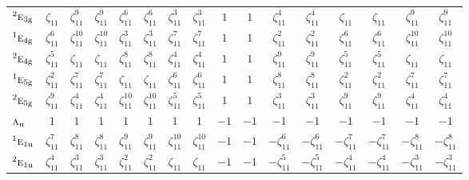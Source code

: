 \documentclass[10pt,a4paper]{article}
\numberwithin{equation}{section}
\newcommand{\irr}[1]{\text{\normalfont\scshape #1}}
\newcommand{\conjpair}[1]{{}^{#1}}
\newcommand{\ptag}[1]{\mathrm{#1}}
\newcommand{\rootunity}[1]{\zeta_{#1}}
\begin{document}
{\begin{longtable}{@{}lccccccccccccccc@{}}
$\conjpair{2}\irr{e}_{3\ptag{g}}$ & $\rootunity{11}$ & $\rootunity{11}^{9}$ & $\rootunity{11}^{9}$ & $\rootunity{11}^{6}$ & $\rootunity{11}^{6}$ & $\rootunity{11}^{3}$ & $\rootunity{11}^{3}$ & $1$ & $1$ & $\rootunity{11}^{4}$ & $\rootunity{11}^{4}$ & $\rootunity{11}$ & $\rootunity{11}$ & $\rootunity{11}^{9}$ & $\rootunity{11}^{9}$\\
$\conjpair{1}\irr{e}_{4\ptag{g}}$ & $\rootunity{11}^{6}$ & $\rootunity{11}^{10}$ & $\rootunity{11}^{10}$ & $\rootunity{11}^{3}$ & $\rootunity{11}^{3}$ & $\rootunity{11}^{7}$ & $\rootunity{11}^{7}$ & $1$ & $1$ & $\rootunity{11}^{2}$ & $\rootunity{11}^{2}$ & $\rootunity{11}^{6}$ & $\rootunity{11}^{6}$ & $\rootunity{11}^{10}$ & $\rootunity{11}^{10}$\\
$\conjpair{2}\irr{e}_{4\ptag{g}}$ & $\rootunity{11}^{5}$ & $\rootunity{11}$ & $\rootunity{11}$ & $\rootunity{11}^{8}$ & $\rootunity{11}^{8}$ & $\rootunity{11}^{4}$ & $\rootunity{11}^{4}$ & $1$ & $1$ & $\rootunity{11}^{9}$ & $\rootunity{11}^{9}$ & $\rootunity{11}^{5}$ & $\rootunity{11}^{5}$ & $\rootunity{11}$ & $\rootunity{11}$\\
$\conjpair{1}\irr{e}_{5\ptag{g}}$ & $\rootunity{11}^{2}$ & $\rootunity{11}^{7}$ & $\rootunity{11}^{7}$ & $\rootunity{11}$ & $\rootunity{11}$ & $\rootunity{11}^{6}$ & $\rootunity{11}^{6}$ & $1$ & $1$ & $\rootunity{11}^{8}$ & $\rootunity{11}^{8}$ & $\rootunity{11}^{2}$ & $\rootunity{11}^{2}$ & $\rootunity{11}^{7}$ & $\rootunity{11}^{7}$\\
$\conjpair{2}\irr{e}_{5\ptag{g}}$ & $\rootunity{11}^{9}$ & $\rootunity{11}^{4}$ & $\rootunity{11}^{4}$ & $\rootunity{11}^{10}$ & $\rootunity{11}^{10}$ & $\rootunity{11}^{5}$ & $\rootunity{11}^{5}$ & $1$ & $1$ & $\rootunity{11}^{3}$ & $\rootunity{11}^{3}$ & $\rootunity{11}^{9}$ & $\rootunity{11}^{9}$ & $\rootunity{11}^{4}$ & $\rootunity{11}^{4}$\\
$\irr{a}_{\ptag{u}}$ & $1$ & $1$ & $1$ & $1$ & $1$ & $1$ & $1$ & $-1$ & $-1$ & $-1$ & $-1$ & $-1$ & $-1$ & $-1$ & $-1$\\
$\conjpair{1}\irr{e}_{1\ptag{u}}$ & $\rootunity{11}^{7}$ & $\rootunity{11}^{8}$ & $\rootunity{11}^{8}$ & $\rootunity{11}^{9}$ & $\rootunity{11}^{9}$ & $\rootunity{11}^{10}$ & $\rootunity{11}^{10}$ & $-1$ & $-1$ & $-\rootunity{11}^{6}$ & $-\rootunity{11}^{6}$ & $-\rootunity{11}^{7}$ & $-\rootunity{11}^{7}$ & $-\rootunity{11}^{8}$ & $-\rootunity{11}^{8}$\\
$\conjpair{2}\irr{e}_{1\ptag{u}}$ & $\rootunity{11}^{4}$ & $\rootunity{11}^{3}$ & $\rootunity{11}^{3}$ & $\rootunity{11}^{2}$ & $\rootunity{11}^{2}$ & $\rootunity{11}$ & $\rootunity{11}$ & $-1$ & $-1$ & $-\rootunity{11}^{5}$ & $-\rootunity{11}^{5}$ & $-\rootunity{11}^{4}$ & $-\rootunity{11}^{4}$ & $-\rootunity{11}^{3}$ & $-\rootunity{11}^{3}$\\

\end{longtable}}
\end{document}
